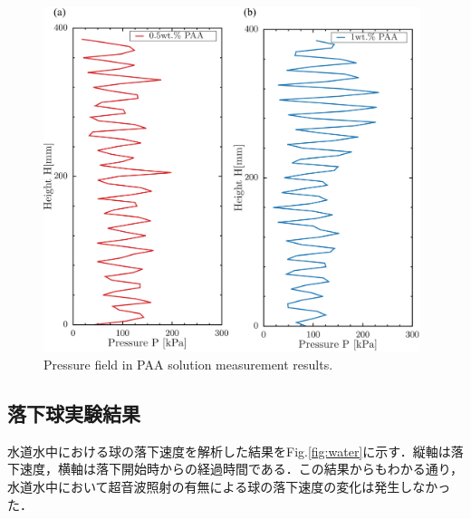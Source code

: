\begin{figure}[ht]
    \centering
    \includegraphics[width=11cm,clip]{4-Results/press.png}
    \caption{Pressure field in PAA solution measurement results.}
    \label{fig:pressure}
\end{figure}

\newpage

\subsection{落下球実験結果}

水道水中における球の落下速度を解析した結果をFig.\ref{fig:water}に示す．縦軸は落下速度，横軸は落下開始時からの経過時間である．この結果からもわかる通り，水道水中において超音波照射の有無による球の落下速度の変化は発生しなかった．

